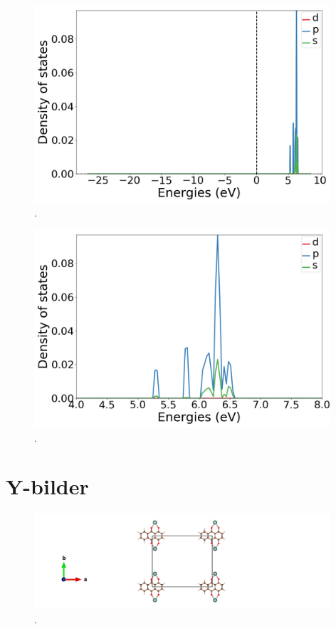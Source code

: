 \documentclass{article}
\begin{document}
  \begin{figure}[H]
      \centering
      \includegraphics[width = 11cm]{../fig/DOS_k4_LDOS26_1.png}
      \caption{. }
      \label{fig:DOS_k4_LDOS26_1}
  \end{figure}

  \begin{figure}[H]
      \centering
      \includegraphics[width = 11cm]{../fig/DOS_k4_LDOS26_2.png}
      \caption{. }
      \label{fig:DOS_k4_LDOS26_2}
  \end{figure}

\vspace{1cm}

\section{Y-bilder}

  \begin{figure}[H]
      \centering
      \includegraphics[width = 11cm]{../fig/Y_staticbefore_CONTCAR.png}
      \caption{. }
      \label{fig:Y_staticbefore_CONTCAR}
  \end{figure}
\end{document}
